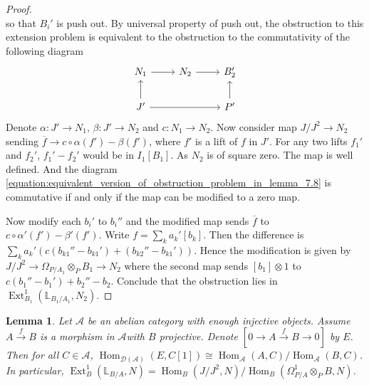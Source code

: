 \documentclass{ctexart}
\newtheorem{lemma}{Lemma}[section]
\renewcommand{\hom}{\operatorname{Hom}}
\newcommand{\ext}{\operatorname{Ext}}
\begin{document}
\begin{proof}
\begin{equation}
    \end{equation}
    so that $B_{i}'$ is push out.
    By universal property of push out, the obstruction to this extension problem is equivalent to the obstruction to the commutativity of the following diagram
    \begin{equation}
        \begin{tikzcd}
            N_{1} \arrow[r] &
            N_{2} \arrow[r] &
            B_{2}' \\
            J' \arrow[u] \arrow[rr] &&
            P' \arrow[u] 
        \end{tikzcd}
        \label{equation:equivalent_version_of_obstruction_problem_in_lemma_7.8}
    \end{equation}
    Denote $\alpha: J' \rightarrow N_{1}$, $\beta: J' \rightarrow N_{2}$ and $c: N_{1} \rightarrow N_{2}$.
    Now consider map $J/J^{2} \rightarrow N_{2}$ sending $\overline{f} \rightarrow c \circ \alpha(f') - \beta(f')$,
    where $f'$ is a lift of $f$ in $J'$.
    For any two lifts $f_{1}'$ and $f_{2}'$, $f_{1}' - f_{2}'$ would be in $I_{1}[B_{1}]$.
    As $N_{2}$ is of square zero.
    The map is well defined.
    And the diagram \ref{equation:equivalent_version_of_obstruction_problem_in_lemma_7.8} is commutative if and only if the map can be modified to a zero map.
    \par
    Now modify each $b_{i}'$ to $b_{i}''$ and the modified map sends $\overline{f}$ to $c \circ \alpha'(f') - \beta'(f')$.
    Write $f = \sum_{k} a_{k}'[b_{k}]$. 
    Then the difference is $\sum_{k} a_{k}'(c(b_{k1}'' - b_{k1}') + (b_{k2}'' - b_{k1}'))$.
    Hence the modification is given by $J/J^{2} \rightarrow \Omega_{P/A_{1}} \otimes_{P} B_{1} \rightarrow N_{2}$ where the second map sends $[b_{1}] \otimes 1$ to $c(b_{1}'' - b_{1}') + b_{2}'' - b_{2}$.
    Conclude that the obstruction lies in $\ext_{B_{1}}^{1}(\mathbb{L}_{B_{1}/A_{1}}, N_{2})$.
\end{proof}
\begin{lemma}
    Let $\mathscr{A}$ be an abelian category with enough injective objects.
    Assume $A \overset{f}{\rightarrow} B$ is a morphism in $\mathscr{A}$with $B$ projective.
    Denote $[0 \rightarrow A \overset{f}{\rightarrow} B \rightarrow 0]$ by $E$.
    Then for all $C\in \mathscr{A}$, $\hom_{\mathcal{D}(\mathscr{A})}(E, C[1]) \cong \hom_{\mathscr{A}}(A, C)/\hom_{\mathscr{A}}(B, C)$. 
    In particular, $\ext_{B}^{1}(\mathbb{L}_{B/A}, N) = \hom_{B}(J/J^{2}, N)/\hom_{B}(\Omega_{P/A}^{1} \otimes_{P} B, N)$.
    \label{Lemma 7.9}
\end{lemma}
\end{document}
